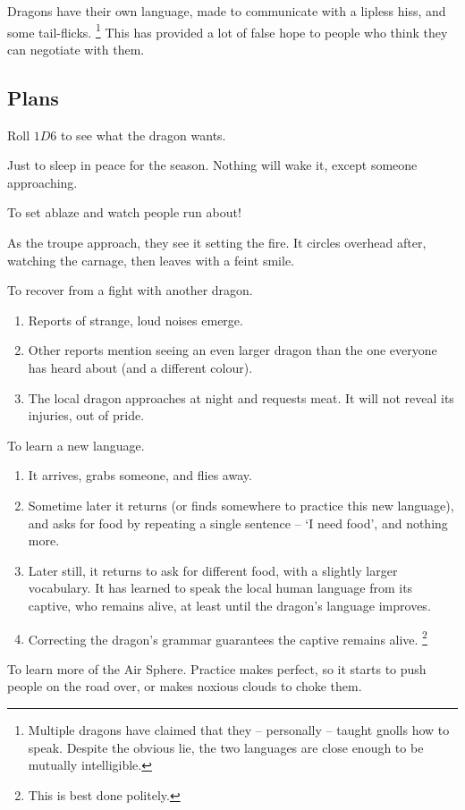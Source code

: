 \begin{multicols}{2}
Dragons have their own language, made to communicate with a lipless hiss, and some tail-flicks.%
\footnote{Multiple dragons have claimed that they -- personally -- taught gnolls how to speak.
Despite the obvious lie, the two languages are close enough to be mutually intelligible.}
This has provided a lot of false hope to people who think they can negotiate with them.

\dragon

\showStdSpells

\subsection{Plans}

Roll $1D6$ to see what the dragon wants.

\begin{dlist}
  \item
  Just to sleep in peace for the season.
  Nothing will wake it, except someone approaching.
  \item
  To set  ablaze and watch people run about!

  As the troupe approach, they see it setting the fire.
  It circles overhead after, watching the carnage, then leaves with a feint smile.
  \item
  To recover from a fight with another dragon.
  \begin{enumerate}
    \item
    Reports of strange, loud noises emerge.
    \item
    Other reports mention seeing an even larger dragon than the one everyone has heard about (and a different colour).
    \item
    The local dragon approaches  at night and requests meat.
    It will not reveal its injuries, out of pride.
  \end{enumerate}
  \item
  To learn a new language.
  \begin{enumerate}
    \item
    It arrives, grabs someone, and flies away.
    \item
    Sometime later it returns (or finds somewhere to practice this new language), and asks for food by repeating a single sentence -- `I need food', and nothing more.
    \item
    Later still, it returns to ask for different food, with a slightly larger vocabulary.
    It has learned to speak the local human language from its captive, who remains alive, at least until the dragon's language improves.
    \item
    Correcting the dragon's grammar guarantees the captive remains alive.%
    \footnote{This is best done politely.}
  \end{enumerate}
  \item
  To learn more of the Air Sphere.
  Practice makes perfect, so it starts to push people on the road over, or makes noxious clouds to choke them.


\end{dlist}
\end{multicols}
